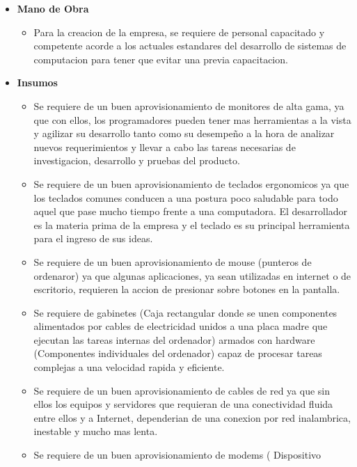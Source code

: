 \documentclass[
10pt, %
a4paper, %
oneside, %
headinclude,footinclude, %
BCOR5mm, %
]{scrartcl}
\begin{document}
\begin{itemize}
  \item \textbf {Mano de Obra}
  \begin{itemize}
    \item Para la creacion de la empresa, se requiere de personal capacitado y
            competente acorde a los actuales estandares del desarrollo de sistemas
            de computacion para tener que evitar una previa capacitacion.
  \end{itemize}

  \item \textbf {Insumos}
  \begin{itemize}
    \item Se requiere de un buen aprovisionamiento de monitores de alta gama,
            ya que con ellos, los programadores pueden tener mas herramientas
            a la vista y agilizar su desarrollo tanto como su desempeño a la
            hora de analizar nuevos requerimientos y llevar a cabo las tareas
            necesarias de investigacion, desarrollo y pruebas del producto.
    \item Se requiere de un buen aprovisionamiento de teclados ergonomicos
            ya que los teclados comunes conducen a una postura poco saludable
            para todo aquel que pase mucho tiempo frente a una computadora.
            El desarrollador es la materia prima de la empresa y el teclado
            es su principal herramienta para el ingreso de sus ideas.
    \item Se requiere de un buen aprovisionamiento de mouse (punteros de ordenaror)
            ya que algunas aplicaciones, ya sean utilizadas en internet o de
            escritorio, requieren la accion de presionar sobre botones en la
            pantalla.
      \item Se requiere de gabinetes (Caja rectangular donde se unen componentes
              alimentados por cables de electricidad unidos a una placa madre
              que ejecutan las tareas internas del ordenador) armados
              con hardware (Componentes individuales del ordenador) capaz
              de procesar tareas complejas a una velocidad rapida y eficiente.
    \item Se requiere de un buen aprovisionamiento de cables de red ya que
            sin ellos los equipos y servidores que requieran de una conectividad
            fluida entre ellos y a Internet, dependerian de una conexion por
            red inalambrica, inestable y mucho mas lenta.
    \item Se requiere de un buen aprovisionamiento de modems ( Dispositivo

\end{itemize}
\end{itemize}
\end{document}
